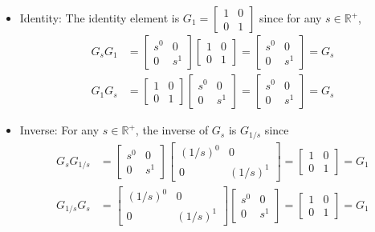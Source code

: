 \documentclass{article}
\begin{document}
\begin{enumerate}
\begin{itemize}
\item Identity: The identity element is $G_1 = \begin{bmatrix} 1 & 0 \\ 0 & 1 \end{bmatrix}$ since for any $s \in \mathbb{R}^+$,
\begin{align*}
G_s G_1 &= \begin{bmatrix} s^0 & 0 \\ 0 & s^1 \end{bmatrix} \begin{bmatrix} 1 & 0 \\ 0 & 1 \end{bmatrix} = \begin{bmatrix} s^0 & 0 \\ 0 & s^1 \end{bmatrix} = G_s \\
G_1 G_s &= \begin{bmatrix} 1 & 0 \\ 0 & 1 \end{bmatrix} \begin{bmatrix} s^0 & 0 \\ 0 & s^1 \end{bmatrix} = \begin{bmatrix} s^0 & 0 \\ 0 & s^1 \end{bmatrix} = G_s
\end{align*}

\item Inverse: For any $s \in \mathbb{R}^+$, the inverse of $G_s$ is $G_{1/s}$ since
\begin{align*}
G_s G_{1/s} &= \begin{bmatrix} s^0 & 0 \\ 0 & s^1 \end{bmatrix} \begin{bmatrix} (1/s)^0 & 0 \\ 0 & (1/s)^1 \end{bmatrix} = \begin{bmatrix} 1 & 0 \\ 0 & 1 \end{bmatrix} = G_1 \\  
G_{1/s} G_s &= \begin{bmatrix} (1/s)^0 & 0 \\ 0 & (1/s)^1 \end{bmatrix} \begin{bmatrix} s^0 & 0 \\ 0 & s^1 \end{bmatrix} = \begin{bmatrix} 1 & 0 \\ 0 & 1 \end{bmatrix} = G_1
\end{align*}
\end{itemize}


\end{enumerate}
\end{document}

